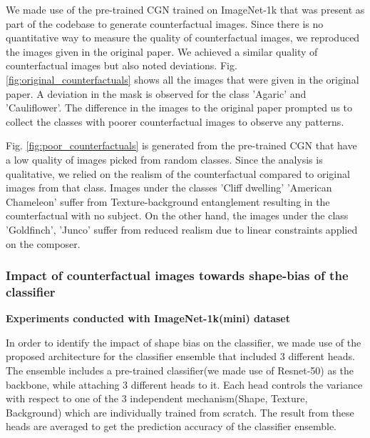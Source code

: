 We made use of the pre-trained CGN trained on ImageNet-1k that was present as part of the codebase to generate counterfactual images. 
Since there is no quantitative way to measure the quality of counterfactual images, we reproduced the images given in the original paper. We achieved a similar quality of counterfactual images but also noted deviations. 
Fig. \ref{fig:original_counterfactuals} shows all the images that were given in the original paper. A deviation in the mask is observed for the class 'Agaric' and 'Cauliflower'. 
The difference in the images to the original paper prompted us to collect the classes with poorer counterfactual images to observe any patterns. 

Fig. \ref{fig:poor_counterfactuals} is generated from the pre-trained CGN that have a low quality of images picked from random classes. Since the analysis is qualitative, we relied on the realism of the counterfactual compared to original images from that class.
Images under the classes 'Cliff dwelling' 'American Chameleon' suffer from Texture-background entanglement resulting in the counterfactual with no subject. On the other hand, the images under the class 'Goldfinch', 'Junco' suffer from reduced realism due to linear constraints applied on the composer.


\subsubsection{Impact of counterfactual images towards shape-bias of the classifier}

\textbf{Experiments conducted with ImageNet-1k(mini) dataset}
\label{section:textshapebg}

In order to identify the impact of shape bias on the classifier, we made use of the proposed architecture for the classifier ensemble that included 3 different heads. The ensemble includes a pre-trained classifier(we made use of Resnet-50) as the backbone, while attaching 3 different heads to it. Each head controls the variance with respect to one of the 3 independent mechanism(Shape, Texture, Background) which are individually trained from scratch. The result from these heads are averaged to get the prediction accuracy of the classifier ensemble.

